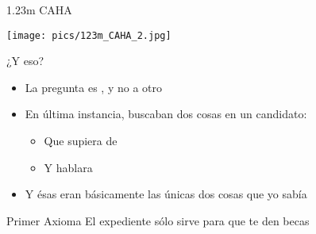 \documentclass[14pt]{beamer}
\newcommand{\WebLink}[2]{
  \href{#1}{\structure{\PointingHand~\color{sail-green}{#2}}}
}
\begin{document}
\begin{frame}{1.23m CAHA}
  \begin{center}
    \texttt{[image: pics/123m\_CAHA\_2.jpg]}
  \end{center}
\end{frame}


\begin{frame}{¿Y eso?}
\begin{itemize}
  \item La pregunta es , y no a otro
  \item En última instancia, buscaban dos cosas en un candidato:
     \begin{itemize}
       \item Que supiera de 
       \item Y hablara 
     \end{itemize}
  \item Y ésas eran básicamente las únicas dos cosas que yo sabía
\end{itemize}
  \begin{alertblock}{\centering Primer Axioma}
    \centering El expediente sólo sirve para que te den becas
  \end{alertblock}
\end{frame}


\end{document}
